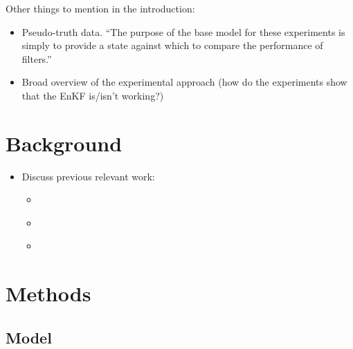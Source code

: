 \documentclass{article}
\begin{document}
Other things to mention in the introduction:
\begin{itemize}
  \item Pseudo-truth data. ``The purpose of the base model for these experiments is simply to provide a state against which to compare the performance of filters.''
  \item Broad overview of the experimental approach (how do the experiments show that the EnKF is/isn't working?)
\end{itemize}





\section{Background}\label{sec:background}


\begin{itemize}
    \item Discuss previous relevant work:
    \begin{itemize}
        \item \citet{ward2016dynamic}
        \item \citet{malleson2020simulating}
        \item \citet{clay2020towards}
    \end{itemize}
\end{itemize}


\section{Methods}\label{sec:methods}


\subsection{Model}\label{sub:methods:model}
\end{document}
